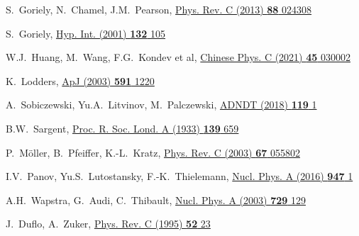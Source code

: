 \begin{thebibliography}{9}
S.~Goriely, N.~Chamel, J.M.~Pearson,
\href{https://doi.org/10.1103/PhysRevC.88.024308}
  {Phys. Rev. C (2013) \textbf{88} 024308}

S.~Goriely,
\href{http://dx.doi.org/10.1023/A:1011929318210}
  {Hyp. Int. (2001) \textbf{132} 105}

W.J.~Huang, M.~Wang, F.G.~Kondev et al,
\href{https://doi.org/10.1088/1674-1137/abddb0}{Chinese Phys. C (2021) \textbf{45} 030002}

K.~Lodders,
\href{https://doi.org/10.1086/375492}{ApJ (2003) \textbf{591} 1220}

A.~Sobiczewski, Yu.A.~Litvinov, M.~Palczewski, 
\href{https://doi.org/10.1016/j.adt.2017.05.001}{ADNDT (2018) \textbf{119} 1}

B.W.~Sargent,
\href{https://doi.org/10.1098/rspa.1933.0045}
  {Proc. R. Soc. Lond. A (1933) \textbf{139} 659}

P.~M\"oller, B.~Pfeiffer, K.-L.~Kratz,
\href{https://link.aps.org/doi/10.1103/PhysRevC.67.055802}
  {Phys. Rev. C (2003) \textbf{67} 055802}

I.V.~Panov, Yu.S.~Lutostansky, F.-K.~Thielemann,
\href{hhttps://doi.org/10.1016/j.nuclphysa.2015.12.001}
  {Nucl. Phys. A (2016) \textbf{947} 1}

A.H.~Wapstra, G.~Audi, C.~Thibault,
\href{https://doi.org/10.1016/j.nuclphysa.2003.11.002}
  {Nucl. Phys. A (2003) \textbf{729} 129}

J.~Duflo, A.~Zuker,
\href{https://doi.org/10.1103/PhysRevC.52.R23}
  {Phys. Rev. C (1995) \textbf{52} 23}


\end{thebibliography}
